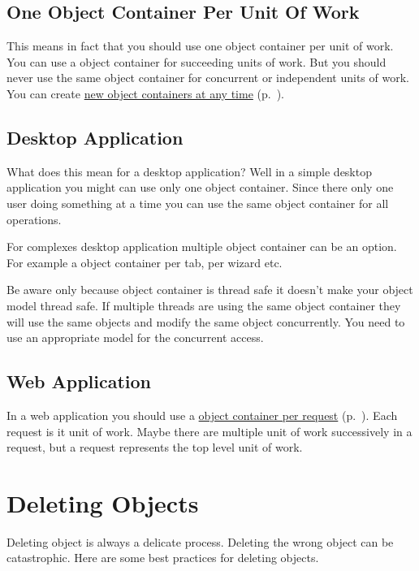 \subsection*{One Object Container Per Unit Of Work}

This means in fact that you should use one object container per unit of work. You can use a object container for succeeding units of work. But you should never use the same object container for concurrent or independent units of work. You can create \hyperref[ref:advanced-topics-session-containers]{new object containers at any time} (p.~\pageref{ref:advanced-topics-session-containers}).

\subsection*{Desktop Application}

What does this mean for a desktop application? Well in a simple desktop application you might can use only one object container. Since there only one user doing something at a time you can use the same object container for all operations.

For complexes desktop application multiple object container can be an option. For example a object container per tab, per wizard etc.

Be aware only because object container is thread safe it doesn't make your object model thread safe. If multiple threads are using the same object container they will use the same objects and modify the same object concurrently. You need to use an appropriate model for the concurrent access.

\subsection*{Web Application}

In a web application you should use a \hyperref[ref:platform-specific-issues-web-web-isolation]{object container per request} (p.~\pageref{ref:platform-specific-issues-web-web-isolation}). Each request is it unit of work. Maybe there are multiple unit of work successively in a request, but a request represents the top level unit of work.

\section{Deleting Objects}
\label{ref:best-practises-deleting-objects}

Deleting object is always a delicate process. Deleting the wrong object can be catastrophic. Here are some best practices for deleting objects.

